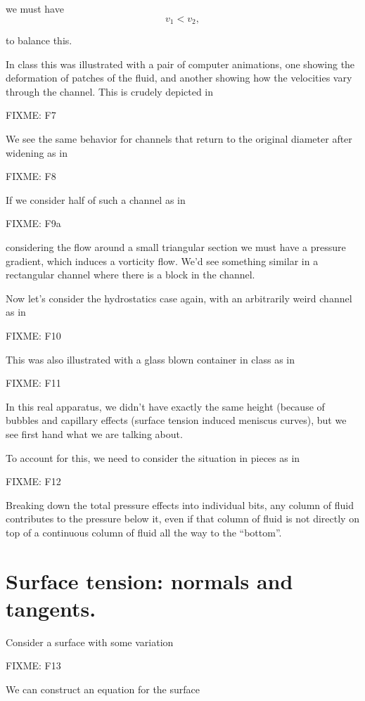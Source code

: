 we must have
\begin{equation}\label{eqn:continuumL13:140}
v_1 < v_2,
\end{equation}

to balance this.

In class this was illustrated with a pair of computer animations, one showing the deformation of patches of the fluid, and another showing how the velocities vary through the channel.  This is crudely depicted in 

FIXME: F7

We see the same behavior for channels that return to the original diameter after widening as in

FIXME: F8

If we consider half of such a channel as in

FIXME: F9a

considering the flow around a small triangular section we must have a pressure gradient, which induces a vorticity flow.  We'd see something similar in a rectangular channel where there is a block in the channel.

Now let's consider the hydrostatics case again, with an arbitrarily weird channel as in

FIXME: F10

This was also illustrated with a glass blown container in class as in 

FIXME: F11

In this real apparatus, we didn't have exactly the same height (because of bubbles and capillary effects (surface tension induced meniscus curves), but we see first hand what we are talking about.

To account for this, we need to consider the situation in pieces as in

FIXME: F12

Breaking down the total pressure effects into individual bits, any column of fluid contributes to the pressure below it, even if that column of fluid is not directly on top of a continuous column of fluid all the way to the ``bottom''.

\section{Surface tension: normals and tangents.}

Consider a surface with some variation

FIXME: F13

We can construct an equation for the surface


